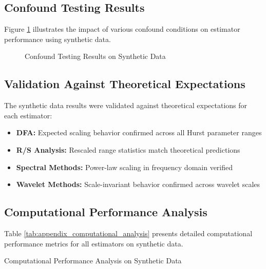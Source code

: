 \subsection{Confound Testing Results}

Figure \ref{fig:appendix_confound_testing} illustrates the impact of various confound conditions on estimator performance using synthetic data.

\begin{figure}[h]
\centering
\caption{Confound Testing Results on Synthetic Data}
\label{fig:appendix_confound_testing}
\end{figure}

\subsection{Validation Against Theoretical Expectations}

The synthetic data results were validated against theoretical expectations for each estimator:

\begin{itemize}
    \item \textbf{DFA:} Expected scaling behavior confirmed across all Hurst parameter ranges
    \item \textbf{R/S Analysis:} Rescaled range statistics match theoretical predictions
    \item \textbf{Spectral Methods:} Power-law scaling in frequency domain verified
    \item \textbf{Wavelet Methods:} Scale-invariant behavior confirmed across wavelet scales
\end{itemize}

\subsection{Computational Performance Analysis}

Table \ref{tab:appendix_computational_analysis} presents detailed computational performance metrics for all estimators on synthetic data.

\begin{table}[h]
\centering
\caption{Computational Performance Analysis on Synthetic Data}
\label{tab:appendix_computational_analysis}
\end{table}

